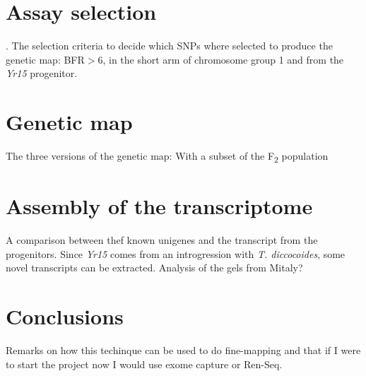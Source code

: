 \section{Assay selection}. 
The selection criteria to decide which SNPs where selected to produce the genetic map: BFR$>$6, in the short arm of chromosome group 1 and from the \textit{Yr15} progenitor.

\section{Genetic map} 
\label{yr15:geneticMap}
The three versions of the genetic map: With a subset of the F\textsubscript{2} population

\section{Assembly of the transcriptome} 
A comparison between thef known unigenes and the transcript from the progenitors. Since \textit{Yr15} comes from an introgression with \textit{T. diccocoides}, some novel transcripts can be extracted. Analysis of the gels from Mitaly? 

\section{Conclusions} 
Remarks on how this techinque can be used to do fine-mapping and that if I were to start the project now I would  use exome capture or Ren-Seq. 